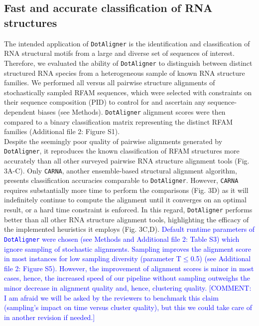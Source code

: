 \documentclass{bmcart}
\newcommand\dotaligner{\texttt{DotAligner}}
\newcommand\carna{\texttt{CARNA}}
\begin{document}
\subsection*{Fast and accurate classification of RNA structures} 

The intended application of \dotaligner{}  is the identification and
classification of RNA structural motifs from a large and diverse set of sequences of interest. 
Therefore, we evaluated the ability of \dotaligner{} to distinguish between distinct structured 
RNA species from a heterogeneous sample of known RNA structure families. 
We performed all versus all pairwise structure alignments of stochastically sampled RFAM sequences, 
which were selected with constraints on their sequence composition (PID) to 
control for and ascertain any sequence-dependent biases (see Methods). 
\dotaligner{} alignment scores were then compared to a binary classification matrix 
representing the distinct RFAM families (Additional file 2: Figure S1).\\

Despite the seemingly poor quality of pairwise alignments generated by \dotaligner{}, it 
reproduces the known classification of RFAM structures more accurately than all 
other surveyed pairwise RNA structure alignment tools (Fig. 3A-C). Only \carna{}, 
another ensemble-based structural alignment algorithm, presents classification accuracies
comparable to \dotaligner{}. However, \carna{} requires substantially more time to perform 
the comparisons (Fig. 3D) as it will indefinitely continue to compute the alignment
until it converges on an optimal result, or a hard time constraint is enforced.  
In this regard, \dotaligner{} performs better than all other RNA structure alignment tools, 
highlighting the efficacy of the implemented heuristics it employs (Fig. 3C,D). 
\textcolor{blue} {
Default runtime parameters of \dotaligner{} were chosen (see Methods and Additional file 2: Table
S3) which ignore sampling of stochastic alignments. Sampling
improves the alignment score in most instances for low sampling diversity
(parameter T$\le$0.5) (see Additional file 2: Figure S5). However, the
improvement of alignment scores is minor in most cases, hence, the increased speed of our
pipeline without sampling outweighs the minor decrease in alignment quality and, hence,
clustering quality. [COMMENT: I am afraid we will be asked by the reviewers
to benchmark this claim (sampling's impact on time versus cluster quality), but
this we could take care of in another revision if needed.] \\
}
\end{document}

